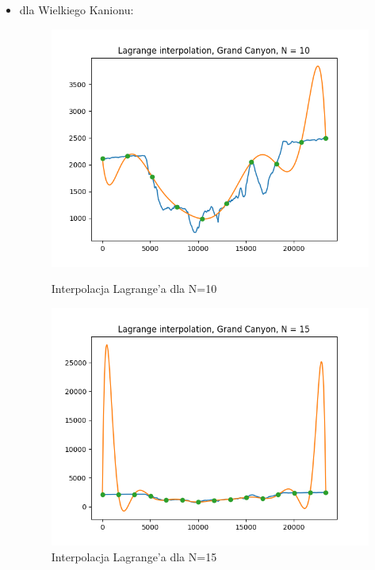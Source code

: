 \documentclass{article}
\begin{document}
\begin{itemize}
    \item dla Wielkiego Kanionu:
    \begin{figure}[!htb]
      \includegraphics[width=\linewidth]{Grand_Canyon_Lagrange_N_10.png}
      \caption{Interpolacja Lagrange'a dla N=10}
    \endminipage\hfill
      \includegraphics[width=\linewidth]{Grand_Canyon_Lagrange_N_15.png}
      \caption{Interpolacja Lagrange'a dla N=15}
    \endminipage\hfill
    \end{figure}  
    

\end{itemize}
\end{document}
